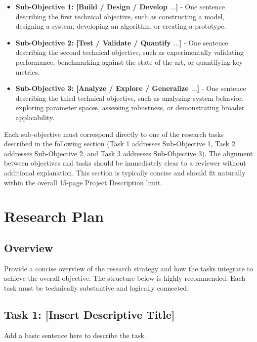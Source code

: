 \documentclass[11pt,letterpaper]{article}
\begin{document}
{\begin{itemize}
    \item \textbf{Sub-Objective 1: [Build / Design / Develop $\dots$]} - One sentence describing the first technical objective, such as constructing a model, designing a system, developing an algorithm, or creating a prototype.
    \item \textbf{Sub-Objective 2: [Test / Validate / Quantify $\dots$]} - One sentence describing the second technical objective, such as experimentally validating performance, benchmarking against the state of the art, or quantifying key metrics.
    \item \textbf{Sub-Objective 3: [Analyze / Explore / Generalize $\dots$]} - One sentence describing the third technical objective, such as analyzing system behavior, exploring parameter spaces, assessing robustness, or demonstrating broader applicability.
\end{itemize}

Each sub-objective must correspond directly to one of the research tasks described in the following section (Task 1 addresses Sub-Objective 1, Task 2 addresses Sub-Objective 2, and Task 3 addresses Sub-Objective 3).
The alignment between objectives and tasks should be immediately clear to a reviewer without additional explanation.
This section is typically concise and should fit naturally within the overall 15-page Project Description limit.


\section{Research Plan}

\subsection{Overview}

Provide a concise overview of the research strategy and how the tasks integrate to achieve the overall objective.
The structure below is highly recommended. Each task must be technically substantive and logically connected.

\subsection{Task 1: [Insert Descriptive Title]}
Add a basic sentence here to describe the task.
}
\end{document}

